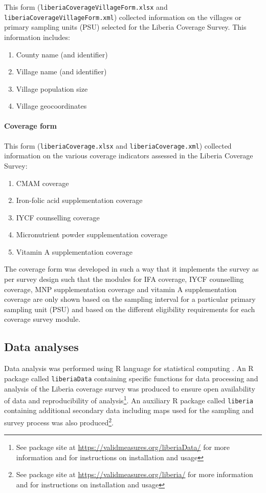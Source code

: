 \documentclass[12pt,a4paper]{article}
\let\oldparagraph\paragraph
\renewcommand{\paragraph}[1]{\oldparagraph{#1}\mbox{}}
\let\rmarkdownfootnote\footnote%
\def\footnote{\protect\rmarkdownfootnote}
\begin{document}
This form (\texttt{liberiaCoverageVillageForm.xlsx} and \texttt{liberiaCoverageVillageForm.xml}) collected information on the villages or primary sampling units (PSU) selected for the Liberia Coverage Survey. This information includes:

\begin{enumerate}
\def\labelenumi{\arabic{enumi}.}
\item
  County name (and identifier)
\item
  Village name (and identifier)
\item
  Village population size
\item
  Village geocoordinates
\end{enumerate}

\hypertarget{coverage-form}{%
\paragraph{Coverage form}\label{coverage-form}}

This form (\texttt{liberiaCoverage.xlsx} and \texttt{liberiaCoverage.xml}) collected information on the various coverage indicators assessed in the Liberia Coverage Survey:

\begin{enumerate}
\def\labelenumi{\arabic{enumi}.}
\item
  CMAM coverage
\item
  Iron-folic acid supplementation coverage
\item
  IYCF counselling coverage
\item
  Micronutrient powder supplementation coverage
\item
  Vitamin A supplementation coverage
\end{enumerate}

The coverage form was developed in such a way that it implements the survey as per survey design such that the modules for IFA coverage, IYCF counselling coverage, MNP supplementation coverage and vitamin A supplementation coverage are only shown based on the sampling interval for a particular primary sampling unit (PSU) and based on the different eligibility requirements for each coverage survey module.

\hypertarget{data-analyses}{%
\subsection{Data analyses}\label{data-analyses}}

Data analysis was performed using R language for statistical computing \citep{R:2019rr}. An R package called \texttt{liberiaData} containing specific functions for data processing and analysis of the Liberia coverage survey was produced to ensure open availability of data and reproducibility of analysis\footnote{See package site at \url{https://validmeasures.org/liberiaData/} for more information and for instructions on installation and usage}. An auxiliary R package called \texttt{liberia} containing additional secondary data including maps used for the sampling and survey process was also produced\footnote{See package site at \url{https://validmeasures.org/liberia/} for more information and for instructions on installation and usage}.
\end{document}

